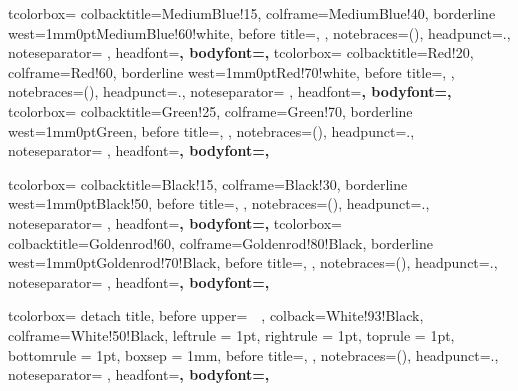   {
    tcolorbox={
		colbacktitle=MediumBlue!15,
		colframe=MediumBlue!40,
		borderline west={1mm}{0pt}{MediumBlue!60!white},
		before title=\large{}\normalsize\hspace{2mm},
    },
    notebraces={(}{)},
    headpunct={.},
    noteseparator={ },
    headfont=\bfseries\sffamily,
    bodyfont=\normalfont,
  }
  {
    tcolorbox={
		colbacktitle=Red!20,
		colframe=Red!60,
		borderline west={1mm}{0pt}{Red!70!white},
		before title=\large{}\normalsize\hspace{2mm},
    },
    notebraces={(}{)},
    headpunct={.},
    noteseparator={ },
    headfont=\bfseries\sffamily,
    bodyfont=\normalfont,
  }
  {
    tcolorbox={
		colbacktitle=Green!25,
		colframe=Green!70,
		borderline west={1mm}{0pt}{Green},
		before title=\large{}\normalsize\hspace{2mm},
    },
    notebraces={(}{)},
    headpunct={.},
    noteseparator={ },
    headfont=\bfseries\sffamily,
    bodyfont=\normalfont,
  }

  {
    tcolorbox={
		colbacktitle=Black!15,
		colframe=Black!30,
		borderline west={1mm}{0pt}{Black!50},
		before title=\large{}\normalsize\hspace{2mm},
    },
    notebraces={(}{)},
    headpunct={.},
    noteseparator={ },
    headfont=\bfseries\sffamily,
    bodyfont=\normalfont,
  }
  {
    tcolorbox={
		colbacktitle=Goldenrod!60,
		colframe=Goldenrod!80!Black,
		borderline west={1mm}{0pt}{Goldenrod!70!Black},
		before title=\large{}\normalsize\hspace{2mm},
    },
    notebraces={(}{)},
    headpunct={.},
    noteseparator={ },
    headfont=\bfseries\sffamily,
    bodyfont=\normalfont,
  }

  {
    tcolorbox={
    		detach title,
    		before upper={\tcbtitle\ \ },
		colback=White!93!Black,
		colframe=White!50!Black,
		leftrule = 1pt,
		rightrule = 1pt,
		toprule = 1pt,
		bottomrule = 1pt,
		boxsep = 1mm,
		before title=\large{}\normalsize\hspace{2mm},
    },
    notebraces={(}{)},
    headpunct={.},
    noteseparator={ },
    headfont=\bfseries\sffamily,
    bodyfont=\normalfont,
  } 
  
